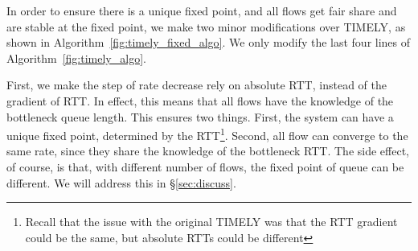In order to ensure there is a unique fixed point, and all flows get fair
share and are stable at the fixed point, we make two minor modifications over
TIMELY, as shown in Algorithm~\ref{fig:timely_fixed_algo}. We only modify the
last four lines of Algorithm~\ref{fig:timely_algo}.

First, we make the step of rate decrease rely on absolute RTT, instead of the
gradient of RTT. In effect, this means that all flows have the knowledge of the
bottleneck queue length.  This ensures two things. First, the system can have a
unique fixed point, determined by the RTT\footnote{Recall that the issue with
the original TIMELY was that the RTT gradient could be the same, but absolute
RTTs could be different}.  Second, all flow can converge to the same rate, since
they share the knowledge of the bottleneck RTT.  The side effect, of course, is
that, with different number of flows, the fixed point of queue can be different.
We will address this in \S\ref{sec:discuss}. 

